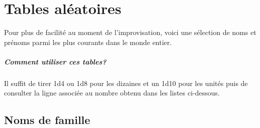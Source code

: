 \documentclass[a5paper,pagesize,10pt,bibliography=totoc,numbers=enddot,
headings=normal,DIV=9,twoside=false,tablecaptionabove]{scrbook}
\begin{document}
\setcounter{tocdepth}{0}
\tableofcontents

































\appendix

\chapter{Tables aléatoires}

Pour plus de facilité au moment de l'improvisation, voici une sélection de noms et prénoms parmi les plus courants dans le monde entier.

\paragraph{Comment utiliser ces tables?} Il suffit de tirer 1d4 ou 1d8 pour les dizaines et un 1d10 pour les unités puis de consulter la ligne associée au nombre obtenu dans les listes ci-dessous.

\section{Noms de famille}
\end{document}
